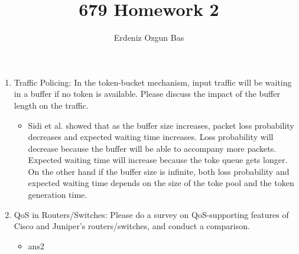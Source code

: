 \documentclass{article}
\title{679 Homework 2}
\author{Erdeniz Ozgun Bas}
\date{}
\begin{document}
\maketitle
\begin{enumerate}
\item Traffic Policing: In the token-bucket mechanism, input traffic will be waiting in a buffer if no token is available. Please discuss the impact of the buffer length on the traffic.
  \begin{itemize}
  \item Sidi et al.\cite{CONG} showed that as the buffer size increases, packet loss probability decreases and expected waiting time increases. Loss probability will decrease because the buffer will be able to accompany more packets. Expected waiting time will increase because the toke queue gets longer. On the other hand if the buffer size is infinite, both loss probability and expected waiting time depends on the size of the toke pool and the token generation time.
  \end{itemize}
\item QoS in Routers/Switches: Please do a survey on QoS-supporting features of Cisco and Juniper’s routers/switches, and conduct a comparison. 
  \begin{itemize}
  \item ans2
  \end{itemize}
\end{enumerate}
 
\end{document}
